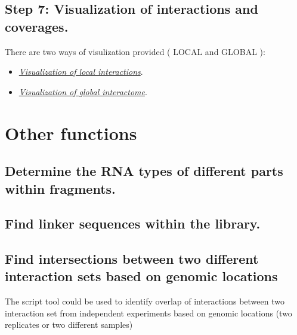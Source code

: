 \documentclass[letterpaper,10pt,english]{sphinxmanual}
\begin{document}
\subsection{Step 7: Visualization of interactions and coverages.}
\label{Analysis_pipeline:step7}\label{Analysis_pipeline:step-7-visualization-of-interactions-and-coverages}
There are two ways of visulization provided ( LOCAL and GLOBAL ):
\begin{itemize}
\item {} 
{\hyperref[Visualization:visualizationlocal]{\emph{Visualization of local interactions}}}.

\item {} 
{\hyperref[Visualization:visualizationglobal]{\emph{Visualization of global interactome}}}.

\end{itemize}


\section{Other functions}
\label{Analysis_pipeline:other-functions}

\subsection{Determine the RNA types of different parts within fragments.}
\label{Analysis_pipeline:rna-types}\label{Analysis_pipeline:determine-the-rna-types-of-different-parts-within-fragments}

\subsection{Find linker sequences within the library.}
\label{Analysis_pipeline:find-linker-sequences-within-the-library}\label{Analysis_pipeline:find-linker}

\subsection{Find intersections between two different interaction sets based on genomic locations}
\label{Analysis_pipeline:find-intersections-between-two-different-interaction-sets-based-on-genomic-locations}\label{Analysis_pipeline:intersection}
The script tool  could be used to identify overlap of interactions between two interaction set from independent experiments based on genomic locations (two replicates or two different samples)
\end{document}
